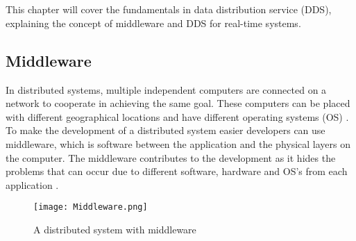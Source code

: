 \documentclass[Main]{subfiles}
\begin{document}
\chapter{}
This chapter will cover the fundamentals in data distribution service (DDS), explaining the concept of middleware and DDS for real-time systems.
\\
\section{Middleware}
In distributed systems, multiple independent computers are connected on a network to cooperate in achieving the same goal. 
These computers can be placed with different geographical locations and have different operating systems (OS) \cite[p. 2]{Tanenbaum}.
\\ 
To make the development of a distributed system easier developers can use middleware, which is software between the application and the physical layers on the computer. 
The middleware contributes to the development as it hides the problems that can occur due to different software, hardware and OS's from each application \cite[p. 3]{Tanenbaum}.

\begin{figure}[htbp]
\centering
\texttt{[image: Middleware.png]}
\caption{A distributed system with middleware \cite[p. 3]{Tanenbaum}}
\label{Fig:Middleware}
\end{figure}
\end{document}
